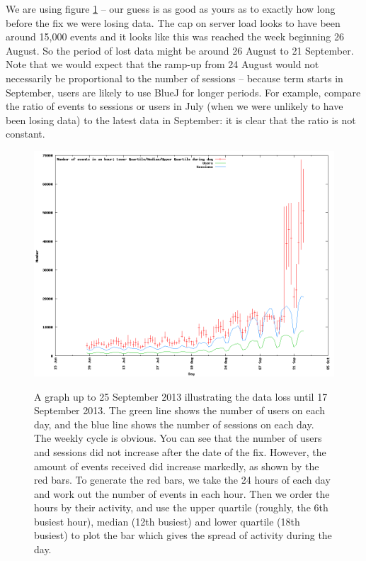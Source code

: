 \documentclass{report}
\begin{document}
We are using figure \ref{fig:data-loss} -- our guess is as good as yours as to exactly how long before the fix we were losing data.  The cap on server load looks to have been around 15,000 events and it looks like this was reached the week beginning 26 August.  So the period of lost data might be around 26 August to 21 September.  Note that we would expect that the ramp-up from 24 August would not necessarily be proportional to the number of sessions -- because term starts in September, users are likely to use BlueJ for longer periods.  For example, compare the ratio of events to sessions or users in July (when we were unlikely to have been losing data) to the latest data in September: it is clear that the ratio is not constant.

\begin{figure}
\includegraphics[width=\textwidth]{data-loss.png}
\label{fig:data-loss}
\caption{A graph up to 25 September 2013 illustrating the data loss until 17 September 2013.  The green line shows the number of users on each day, and the blue line shows the number of sessions on each day.  The weekly cycle is obvious.  You can see that the number of users and sessions did not increase after the date of the fix.  However, the amount of events received did increase markedly, as shown by the red bars.  To generate the red bars, we take the 24 hours of each day and work out the number of events in each hour.  Then we order the hours by their activity, and use the upper quartile (roughly, the 6th busiest hour), median (12th busiest) and lower quartile (18th busiest) to plot the bar which gives the spread of activity during the day.
}
\end{figure}
\end{document}
